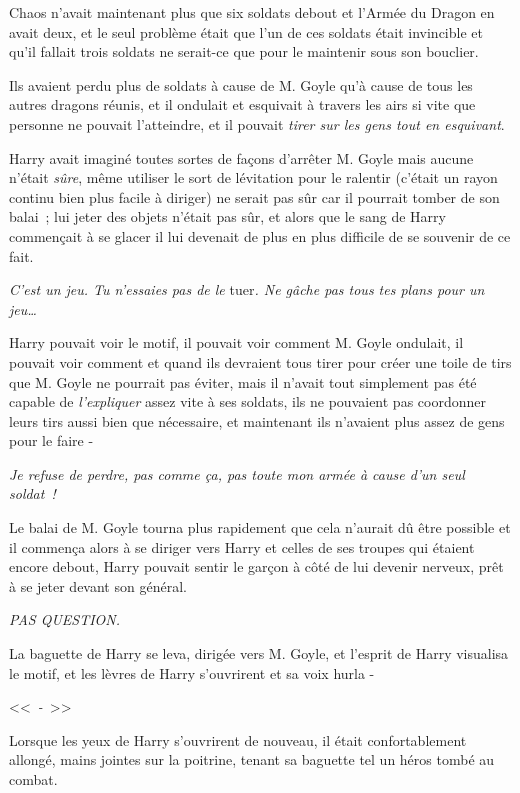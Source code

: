 Chaos n'avait maintenant plus que six soldats debout et l'Armée du Dragon en avait deux, et le seul problème était que l'un de ces soldats était invincible et qu'il fallait trois soldats ne serait-ce que pour le maintenir sous son bouclier.

Ils avaient perdu plus de soldats à cause de M. Goyle qu'à cause de tous les autres dragons réunis, et il ondulait et esquivait à travers les airs si vite que personne ne pouvait l'atteindre, et il pouvait \emph{tirer sur les gens tout en esquivant}.

Harry avait imaginé toutes sortes de façons d'arrêter M. Goyle mais aucune n'était \emph{sûre}, même utiliser le sort de lévitation pour le ralentir (c'était un rayon continu bien plus facile à diriger) ne serait pas sûr car il pourrait tomber de son balai~; lui jeter des objets n'était pas sûr, et alors que le sang de Harry commençait à se glacer il lui devenait de plus en plus difficile de se souvenir de ce fait.

\emph{C'est un jeu. Tu n'essaies pas de le} tuer\emph{. Ne gâche pas tous tes plans pour un jeu…}

Harry pouvait voir le motif, il pouvait voir comment M. Goyle ondulait, il pouvait voir comment et quand ils devraient tous tirer pour créer une toile de tirs que M. Goyle ne pourrait pas éviter, mais il n'avait tout simplement pas été capable de \emph{l'expliquer} assez vite à ses soldats, ils ne pouvaient pas coordonner leurs tirs aussi bien que nécessaire, et maintenant ils n'avaient plus assez de gens pour le faire -

\emph{Je refuse de perdre, pas comme ça, pas toute mon armée à cause d'un seul soldat~!}

Le balai de M. Goyle tourna plus rapidement que cela n'aurait dû être possible et il commença alors à se diriger vers Harry et celles de ses troupes qui étaient encore debout, Harry pouvait sentir le garçon à côté de lui devenir nerveux, prêt à se jeter devant son général.

\emph{PAS QUESTION.}

La baguette de Harry se leva, dirigée vers M. Goyle, et l'esprit de Harry visualisa le motif, et les lèvres de Harry s'ouvrirent et sa voix hurla -

<<~\emph{-}~>>

\later

Lorsque les yeux de Harry s'ouvrirent de nouveau, il était confortablement allongé, mains jointes sur la poitrine, tenant sa baguette tel un héros tombé au combat.


